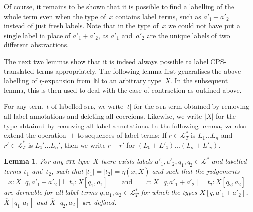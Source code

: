 \documentclass{LMCS}
\theoremstyle{definition}
\theoremstyle{plain}
\newtheorem{lemma}[thm]{Lemma}
\newcommand{\NN}{\mathbb{N}}
\newcommand{\I}[2]{#1 \colon #2}
\newcommand{\SeqTm}[3]{#1 \vdash #2 \colon #3}
\newcommand{\LL}{\mathcal{L}}
\newcommand{\LT}{\mathcal{L}_T}
\begin{document}
Of course, it remains to be shown that it is possible to find a labelling
of the whole term even when the type of~$x$ contains label terms, such as
${a'_1+a'_2}$ instead of just fresh labels.
Note that in the type of~$x$ we could not have put a single label in place of 
 ${a'_1+a'_2}$, as $a'_1$ and~$a'_2$ are the unique labels of  
two different abstractions.

The next two lemmas show that it is indeed always possible to label CPS-translated 
terms appropriately.
The following lemma first generalises the above labelling of $\eta$-expansion
from~$\NN$ to an arbitrary type~$X$. In the subsequent lemma, this is then used 
to deal with the case of contraction as outlined above.

For any term~$t$ of labelled \textsc{stl}, we write $|t|$ for
the \textsc{stl}-term obtained by removing all label annotations
and deleting all coercions. Likewise, we write $|X|$ for the 
type obtained by removing all label annotations.
In the following lemma, we also extend the operation~$+$ 
to sequences of label terms: If $r\in \LT^*$ is $L_1\dots L_n$
and $r'\in \LT^*$ is $L_1'\dots L_n'$, then we write
$r+r'$ for $(L_1 + L'_1) \dots (L_n + L'_n)$.
\begin{lemma}
  \label{lem:eta}
  For any \textsc{stl}-type~$X$ there exists labels $a'_1, a'_2, q_1, q_2 \in \LL^*$   
  and labelled terms~$t_1$ and~$t_2$, such that
  $|t_1| = |t_2| = \eta(x,\overline X)$ and 
  such that the judgements
  \[
    \SeqTm{\I x {\overline X[q, a'_1 + a'_2]}}{t_1}{\overline X[q_1, a_1]}
      \qquad\text{and}\qquad
      \SeqTm{\I x {\overline X[q, a'_1 + a'_2]}}{t_2}{\overline X[q_2, a_2]}
  \]
  are derivable for all label terms $q, a_1, a_2\in \LT^*$ for which the types
  ${\overline X[q,  a'_1 + a'_2]}$,
  ${\overline X[q_1, a_1]}$ and ${\overline X[q_2, a_2]}$ are defined.   
\end{lemma}
\end{document}
